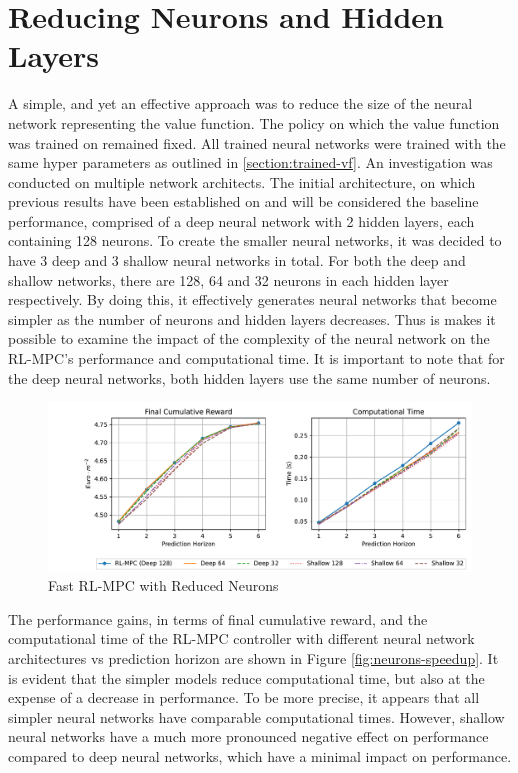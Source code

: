 \section{Reducing Neurons and Hidden Layers}
A simple, and yet an effective approach was to reduce the size of the neural network representing the value function. The policy on which the value function was trained on remained fixed. All trained neural networks were trained with the same hyper parameters as outlined in \autoref{section:trained-vf}. An investigation was conducted on multiple network architects. The initial architecture, on which previous results have been established on and will be considered the baseline performance, comprised of a deep neural network with 2 hidden layers, each containing 128 neurons.
To create the smaller neural networks, it was decided to have 3 deep and 3 shallow neural networks in total. For both the deep and shallow networks, there are 128, 64 and 32 neurons in each hidden layer respectively. By doing this, it effectively generates neural networks that become simpler as the number of neurons and hidden layers decreases. Thus is makes it possible to examine the impact of the complexity of the neural network on the RL-MPC's performance and computational time. It is important to note that for the deep neural networks, both hidden layers use the same number of neurons. 

\begin{figure}[H]
	\centering
	\includegraphics[width=\textwidth]{figures/speed_up_neurons.pdf}
	\caption{Fast RL-MPC with Reduced Neurons}
	\label{fig:neurons-speedup}
\end{figure}

The performance gains, in terms of final cumulative reward, and the computational time of the RL-MPC controller with different neural network architectures vs prediction horizon are shown in Figure \autoref{fig:neurons-speedup}. It is evident that the simpler models reduce computational time, but also at the expense of a decrease in performance. To be more precise, it appears that all simpler neural networks have comparable computational times. However, shallow neural networks have a much more pronounced negative effect on performance compared to deep neural networks, which have a minimal impact on performance.


